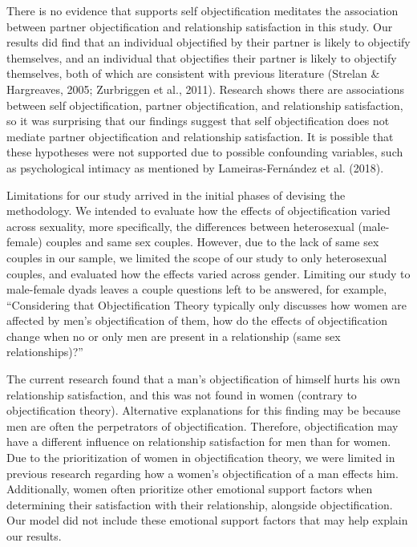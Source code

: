 \documentclass[
  man]{apa6}
\begin{document}
There is no evidence that supports self objectification meditates the association between partner objectification and relationship satisfaction in this study. Our results did find that an individual objectified by their partner is likely to objectify themselves, and an individual that objectifies their partner is likely to objectify themselves, both of which are consistent with previous literature (Strelan \& Hargreaves, 2005; Zurbriggen et al., 2011). Research shows there are associations between self objectification, partner objectification, and relationship satisfaction, so it was surprising that our findings suggest that self objectification does not mediate partner objectification and relationship satisfaction. It is possible that these hypotheses were not supported due to possible confounding variables, such as psychological intimacy as mentioned by Lameiras-Fernández et al. (2018).

Limitations for our study arrived in the initial phases of devising the methodology. We intended to evaluate how the effects of objectification varied across sexuality, more specifically, the differences between heterosexual (male-female) couples and same sex couples. However, due to the lack of same sex couples in our sample, we limited the scope of our study to only heterosexual couples, and evaluated how the effects varied across gender. Limiting our study to male-female dyads leaves a couple questions left to be answered, for example, ``Considering that Objectification Theory typically only discusses how women are affected by men's objectification of them, how do the effects of objectification change when no or only men are present in a relationship (same sex relationships)?''

The current research found that a man's objectification of himself hurts his own relationship satisfaction, and this was not found in women (contrary to objectification theory). Alternative explanations for this finding may be because men are often the perpetrators of objectification. Therefore, objectification may have a different influence on relationship satisfaction for men than for women. Due to the prioritization of women in objectification theory, we were limited in previous research regarding how a women's objectification of a man effects him. Additionally, women often prioritize other emotional support factors when determining their satisfaction with their relationship, alongside objectification. Our model did not include these emotional support factors that may help explain our results.
\end{document}
